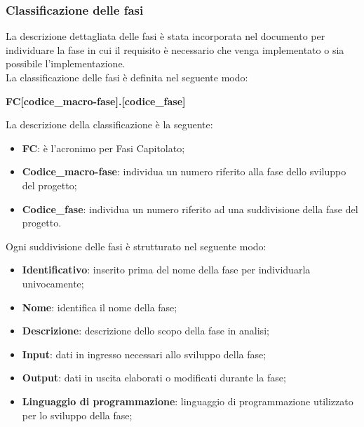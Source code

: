 \subsubsection{Classificazione delle fasi}\label{2.2.3.7}%
La descrizione dettagliata delle fasi è stata incorporata nel documento per individuare la fase in cui il requisito è necessario che venga implementato o sia possibile l'implementazione.\\
La classificazione delle fasi è definita nel seguente modo:
\begin{center}
	\textbf{FC[codice\_macro-fase].[codice\_fase]}
\end{center}
La descrizione della classificazione è la seguente:
\begin{itemize}
	\item \textbf{FC}: è l'acronimo per Fasi Capitolato;
	\item \textbf{Codice\_macro-fase}: individua un numero riferito alla fase dello sviluppo del progetto;
	\item \textbf{Codice\_fase}: individua un numero riferito ad una suddivisione della fase del progetto.
\end{itemize}
Ogni suddivisione delle fasi è strutturato nel seguente modo:
\begin{itemize}
	\item \textbf{Identificativo}: inserito prima del nome della fase per individuarla univocamente;
	\item \textbf{Nome}: identifica il nome della fase;
	\item \textbf{Descrizione}: descrizione dello scopo della fase in analisi;
	\item \textbf{Input}: dati in ingresso necessari allo sviluppo della fase;
	\item \textbf{Output}: dati in uscita elaborati o modificati durante la fase;
	\item \textbf{Linguaggio di programmazione}: linguaggio di programmazione utilizzato per lo sviluppo della fase;
\end{itemize}

